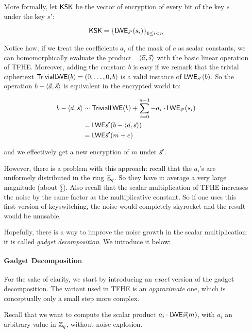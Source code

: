 More formally, let $\textsf{KSK}$ be the vector of encryption of every bit of the key $s$ under the key $s'$:

\[
	\textsf{KSK} = \left \{ \textsf{LWE}_{\vec s'}(s_i ) \right \}_{0 \le i < n}
\]

Notice how, if we treat the coefficients $a_i$ of the mask of $c$ as scalar constants, we can homomorphically evaluate the product $- \langle \vec a ,\vec s \rangle$ with the basic linear operation of TFHE. Moreover, adding the constant $b$ is easy if we remark that the trivial ciphertext $\textsf{TrivialLWE}(b) = (0, \dots, 0, b)$ is a valid instance of $\textsf{LWE}_{\vec s'}(b)$. So the operation $b - \langle \vec a, \vec s \rangle$ is equivalent in the encrypted world to:


\begin{align*}
	b - \langle \vec a, \vec s \rangle &\sim \textsf{TrivialLWE}(b) + \sum_{i=0}^{n-1} -a_i \cdot \textsf{LWE}_{\vec s'}(s_i)\\
	& = \textsf{LWE}{\vec s'}(b - \langle \vec a, \vec s \rangle)\\
		 &= \textsf{LWE}{\vec s'}(m + e)
\end{align*}


and we effectively get a new encryption of $m$ under $\vec s'$.


However, there is a problem with this approach: recall that the $a_i$'s are uniformely distributed in the ring $\mathbb{Z}_q$. So they have in average a very large magnitude (about $\frac q 4$). Also recall that the scalar multiplication of TFHE increases the noise by the same factor as the multiplicative constant. So if one uses this first version of keyswitching, the noise would completely skyrocket and the result would be unusable.

Hopefully, there is a way to improve the noise growth in the scalar multiplication: it is called \textit{gadget decomposition}. We introduce it below:

\paragraph{Gadget Decomposition}

For the sake of clarity, we start by introducing an \textit{exact} version of the gadget decomposition. The variant used in TFHE is an \textit{approximate} one, which is conceptually only a small step more complex.


Recall that we want to compute the scalar product $a_i \cdot \textsf{LWE}{\vec s}(m)$, with $a_i$ an arbitrary value in $\mathbb{Z}_q$, without noise explosion.


